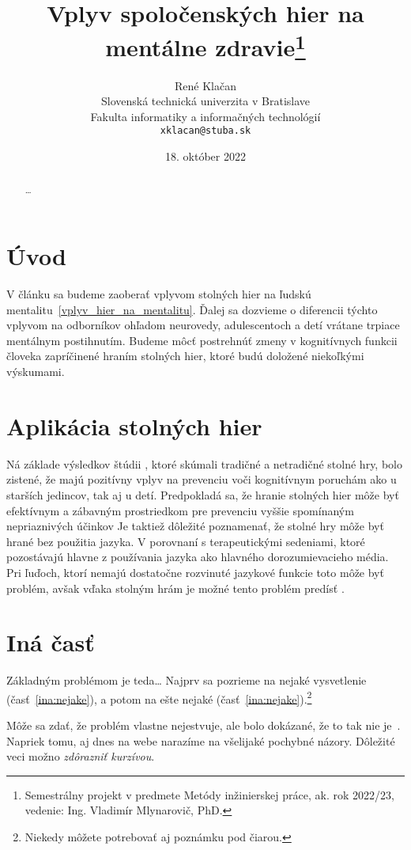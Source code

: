 \documentclass[10pt,oneside,slovak,a4paper]{article}
\title{Vplyv spoločenských hier na mentálne zdravie\thanks{Semestrálny projekt v predmete Metódy inžinierskej práce, ak. rok 2022/23, vedenie: Ing. Vladimír Mlynarovič, PhD.}} %
\author{René Klačan\\[2pt]
	{\small Slovenská technická univerzita v Bratislave}\\
	{\small Fakulta informatiky a informačných technológií}\\
	{\small \texttt{xklacan@stuba.sk}}
	}
\date{\small 18. október 2022}
\begin{document}
\maketitle
\begin{abstract}
\ldots
\end{abstract}



\section{Úvod}

V článku sa budeme zaoberať vplyvom stolných hier na ľudskú mentalitu~\ref{vplyv_hier_na_mentalitu}. Ďalej sa dozvieme o diferencii týchto vplyvom na odborníkov ohľadom neurovedy, adulescentoch a detí vrátane trpiace mentálnym postihnutím. Budeme môcť postrehnúť zmeny v kognitívnych funkcii človeka zapríčinené hraním stolných hier, ktoré budú doložené niekoľkými výskumami.


\section{Aplikácia stolných hier} \label{aplikacie_hier}
Ná základe výsledkov štúdii \cite{Nakao:BG}, ktoré skúmali tradičné a netradičné stolné hry, bolo zistené, že majú pozitívny vplyv na prevenciu voči kognitívnym poruchám ako u starších jedincov, tak aj u detí.
Predpokladá sa, že hranie stolných hier môže byť efektívnym a zábavným prostriedkom pre prevenciu vyššie spomínaným nepriaznivých účinkov \cite{Edu:GFH}
Je taktiež dôležité poznamenať, že stolné hry môže byť hrané bez použitia jazyka. V porovnaní s terapeutickými sedeniami, ktoré pozostávajú hlavne z používania jazyka ako hlavného dorozumievacieho média. Pri ľuďoch, ktorí nemajú dostatočne rozvinuté jazykové funkcie toto môže byť problém, avšak vďaka stolným hrám je možné tento problém predísť \cite{Charlier:2013}.




\section{Iná časť} \label{ina}

Základným problémom je teda\ldots{} Najprv sa pozrieme na nejaké vysvetlenie (časť~\ref{ina:nejake}), a potom na ešte nejaké (časť~\ref{ina:nejake}).\footnote{Niekedy môžete potrebovať aj poznámku pod čiarou.}

Môže sa zdať, že problém vlastne nejestvuje\cite{Coplien:MPD}, ale bolo dokázané, že to tak nie je~\cite{Czarnecki:Staged, Czarnecki:Progress}. Napriek tomu, aj dnes na webe narazíme na všelijaké pochybné názory\cite{PLP-Framework}. Dôležité veci možno \emph{zdôrazniť kurzívou}.
\end{document}
